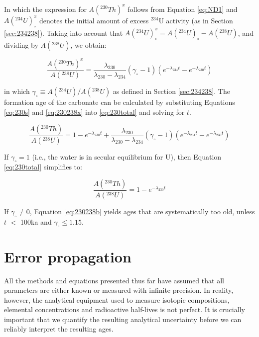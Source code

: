 \documentclass{book}
\begin{document}
In which the expression for $A(^{230}Th)^x$ follows from Equation
\ref{eq:ND1} and $A(^{234}U)_\circ^x$ denotes the initial amount of
excess $^{234}$U activity (as in Section \ref{sec:234238}). Taking
into account that $A(^{234}U)_\circ^x = A(^{234}U)_\circ -
A(^{238}U)$, and dividing by $A(^{238}U)$, we obtain:

\begin{equation}
\frac{A(^{230}Th)^x}{A(^{238}U)} = \frac{\lambda_{230}}{\lambda_{230}-\lambda_{234}} (\gamma_\circ-1)
\left(e^{-\lambda_{234}t}-e^{-\lambda_{230}t}\right)
\label{eq:230238x}
\end{equation}

in which $\gamma_\circ \equiv A(^{234}U)/A(^{238}U)$ as defined in
Section \ref{sec:234238}. The formation age of the carbonate can be
calculated by substituting Equations \ref{eq:230s} and \ref{eq:230238x}
into \ref{eq:230total} and solving for $t$. 

\begin{equation}
  \frac{A(^{230}Th)}{A(^{238}U)} = 1 - e^{-\lambda_{230}t} +
  \frac{\lambda_{230}}{\lambda_{230}-\lambda_{234}} (\gamma_\circ-1)
\left(e^{-\lambda_{234}t}-e^{-\lambda_{230}t}\right)
\label{eq:230238}
\end{equation}

If $\gamma_\circ = 1$ (i.e., the water is in secular equilibrium for
U), then Equation \ref{eq:230total} simplifies to:

\begin{equation}
\frac{A(^{230}Th)}{A(^{238}U)} = 1-e^{-\lambda_{230}t}
\label{eq:230238b}
\end{equation}

If $\gamma_\circ \neq 0$, Equation \ref{eq:230238b} yields ages that
are systematically too old, unless $t$ $<$ 100ka and $\gamma_\circ \leq
1.15$.

\chapter{Error propagation}
\label{sec:error-propagation}

All the methods and equations presented thus far have assumed that all
parameters are either known or measured with infinite precision. In
reality, however, the analytical equipment used to measure isotopic
compositions, elemental concentrations and radioactive half-lives is
not perfect.  It is crucially important that we quantify the resulting
analytical uncertainty before we can reliably interpret the resulting
ages.\\
\end{document}
